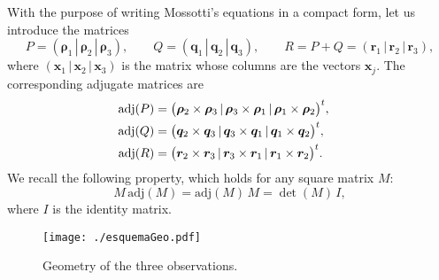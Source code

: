 \documentclass[11pt]{article}
\def\adj{\text{adj}}
\begin{document}
With the purpose of writing Mossotti's equations in a compact form, let us introduce the matrices
\begin{equation}
    P = (\bm{\rho}_1\, |\, \bm{\rho}_2  \,|\, \bm{\rho}_3),\qquad
    Q = (\bm{q}_1\, |\, \bm{q}_2  \,|\, \bm{q}_3),\qquad
    R = P + Q = (\bm{r}_1\, |\, \bm{r}_2  \,|\, \bm{r}_3),
\label{eq:PQR}
\end{equation}
where $(\bm{x}_1 \,|\, \bm{x}_2 \,|\, \bm{x}_3)$ is the matrix whose columns are the vectors $\bm{x}_j$. 
The corresponding adjugate matrices are
\begin{equation*}
    \begin{split}
    \adj(P) &=
    \bigl(\bm{\rho}_2\times\bm{\rho}_3\,|\,
    \bm{\rho}_3\times\bm{\rho}_1\,|\,
    \bm{\rho}_1\times\bm{\rho}_2\bigr)^t,\cr
    \adj(Q) &=
    \bigl(\bm{q}_2\times\bm{q}_3\,|\,
    \bm{q}_3\times\bm{q}_1\,|\,
    \bm{q}_1\times\bm{q}_2\bigr)^t,\cr
    \adj(R) &=
    \bigl(\bm{r}_2\times\bm{r}_3\,|\,
    \bm{r}_3\times\bm{r}_1\,|\,
    \bm{r}_1\times\bm{r}_2\bigr)^t.\cr
    \end{split}
\end{equation*}
We recall the following property, which holds for any square matrix $M$:
\begin{equation}
    M\,\adj(M) = \adj(M)\,M = \det(M)\,I,
\label{adjdet}
\end{equation}
where $I$ is the identity matrix.

\begin{figure}[ht!] 
    \begin{center}
    \texttt{[image: ./esquemaGeo.pdf]}
   \end{center}
    \vspace{-1mm}
    \caption{Geometry of the three observations.}
    \label{fig:esquemaGeo}
\end{figure}
\end{document}
